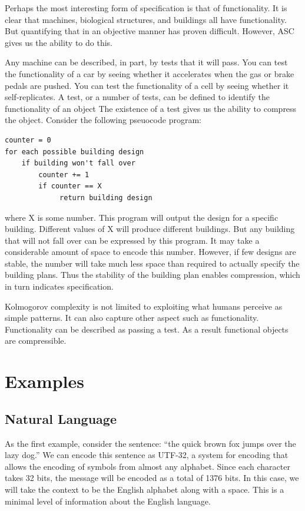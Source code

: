 Perhaps the most interesting form of specification is that of functionality.
It is clear that machines, biological structures, and buildings all have functionality.
But quantifying that in an objective manner has proven difficult.
However, ASC gives us the ability to do this.

Any machine can be described, in part, by tests that it will pass.
You can test the functionality of a car by seeing whether it accelerates when the gas or brake pedals are pushed.
You can test the functionality of a cell by seeing whether it self-replicates.
A test, or a number of tests, can be defined to identify the functionality of an object 
The existence of a test gives us the ability to compress the object.
Consider the following pseuocode program:
\begin{verbatim}
counter = 0
for each possible building design
    if building won't fall over
        counter += 1
        if counter == X
             return building design
\end{verbatim} where X is some number.
This program will output the design for a specific building.
Different values of X will produce different buildings.
But any building that will not fall over can be expressed by this program.
It may take a considerable amount of space to encode this number.
However, if few designs are stable, the number will take much less space than required to actually specify the building plans.
Thus the stability of the building plan enables compression, which in turn indicates specification.

Kolmogorov complexity is not limited to exploiting what humans perceive as simple patterns.
It can also capture other aspect such as functionality.
Functionality can be described as passing a test.
As a result functional objects are compressible.

\section{Examples}
\subsection{Natural Language}
As the first example, consider the sentence: ``the quick brown fox jumps over the lazy dog.''
We can encode this sentence as UTF-32, a system for encoding that allows the encoding of symbols from almost any alphabet.
Since each character takes 32 bits, the message will be encoded as a total of 1376 bits.
In this case, we will take the context to be the English alphabet along with a space.
This is a minimal level of information about the English language.

